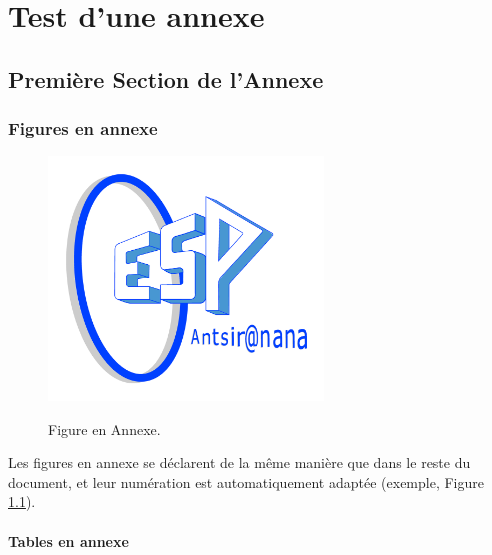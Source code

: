 \chapter{Test d'une annexe}

\section{Première Section de l'Annexe}

\subsection{Figures en annexe}

\begin{figure}
    \centering
        \includegraphics[width=0.65\textwidth]{figures/logoESPA.png}
	 \\ \parbox{0.75\textwidth}{\caption{Figure en Annexe.}\label{fig:testAp}}
\end{figure}

Les figures en annexe se déclarent de la même manière que dans le reste du document, et leur numération est automatiquement adaptée (exemple, Figure \ref{fig:testAp}).

\subsubsection{Tables en annexe}

